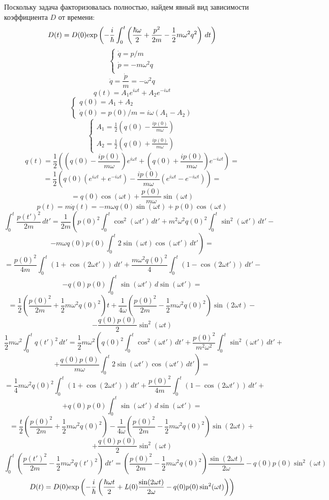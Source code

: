 Поскольку задача факторизовалась полностью, найдем явный вид зависимости коэффициента $D$ от времени:
$$D(t) = D(0)\text{exp}\left( -\frac{i}{\hbar}\int_0^t\left(\frac{\hbar\omega}{2}+\frac{p^2}{2m}-\frac{1}{2}m\omega^2q^2\right)\,dt \right)$$
$$\begin{cases} \dot{q}= p / m \\ \dot{p}=-m\omega^2q \\ \end{cases}$$
$$\ddot{q}=\frac{\dot{p}}{m}=-\omega^2q$$
$$q(t)=A_1 e^{i\omega t} + A_2 e^{-i\omega t} $$
$$\begin{cases} q(0)=A_1 + A_2 \\ \dot{q}(0)=p(0) / m=i\omega(A_1-A_2) \end{cases}$$
$$\begin{cases} A_1 = \frac{1}{2}\left(q(0)-\frac{ip(0)}{m\omega}\right) \\ %
		A_2 = \frac{1}{2}\left(q(0)+\frac{ip(0)}{m\omega}\right) \end{cases} $$
$$q(t) = \frac{1}{2}\left(\left(q(0)-\frac{ip(0)}{m\omega}\right)e^{i\omega t}+%
			  \left(q(0)+\frac{ip(0)}{m\omega}\right)e^{-i\omega t}\right)=$$
$$=\frac{1}{2}\left(q(0)\left(e^{i\omega t}+e^{-i\omega t}\right)-%
		    \frac{ip(0)}{m\omega}\left(e^{i\omega t}-e^{-i\omega t}\right)\right)=$$
$$=q(0)\cos(\omega t)+\frac{p(0)}{m\omega}\sin(\omega t)$$
$$p(t) = m\dot{q}(t) = -m\omega q(0)\sin(\omega t) + p(0) \cos(\omega t)$$
$$\int_0^t\frac{p(t')^2}{2m}\,dt'= \frac{1}{2m}\left(p(0)^2\int_0^t\cos^2(\omega t')\,dt'+%
						     m^2\omega^2q(0)^2\int_0^t\sin^2(\omega t')\,dt'-\right.$$
$$\left.-m\omega q(0)p(0)\int_0^t2\sin(\omega t)\cos(\omega t')\,dt'\right)=$$
$$=\frac{p(0)^2}{4m}\int_0^t(1+\cos(2\omega t'))\,dt'+\frac{m\omega^2q(0)^2}{4}\int_0^t(1-\cos(2\omega t'))\,dt'-$$
$$-q(0)p(0)\int_0^t\sin(\omega t')\,d\sin( \omega t' )=$$
$$=\frac{1}{2}\left(\frac{p(0)^2}{2m}+\frac{1}{2}m\omega^2q(0)^2\right)t+%
   \frac{1}{4\omega}\left(\frac{p(0)^2}{2m}-\frac{1}{2}m\omega^2q(0)^2\right)\sin(2\omega t)-$$
$$-\frac{q(0)p(0)}{2}\sin^2(\omega t)$$
$$\frac{1}{2}m\omega^2\int_0^tq(t')^2\,dt'=\frac{1}{2}m\omega^2\left(q(0)^2\int_0^t\cos^2(\omega t')\,dt'+%
							             \frac{p(0)^2}{m^2\omega^2}\int_0^t\sin^2(\omega t')\,dt'+\right.$$
$$\left.+\frac{q(0)p(0)}{m\omega}\int_0^t2\sin(\omega t')\cos(\omega t')\,dt'\right)=$$
$$=\frac{1}{4}m\omega^2q(0)^2\int_0^t(1+\cos(2\omega t'))\,dt'+\frac{p(0)^2}{4m}\int_0^t(1-\cos(2\omega t'))\,dt'+$$
$$+q(0)p(0)\int_0^t\sin(\omega t')\,d\sin(\omega t')=$$
$$=\frac{t}{2}\left(\frac{p(0)^2}{2m}+\frac{1}{2}m\omega^2q(0)^2\right)-%
   \frac{1}{4\omega}\left(\frac{p(0)^2}{2m}-\frac{1}{2}m\omega^2q(0)^2\right)\sin(2\omega t)+$$
$$+\frac{q(0)p(0)}{2}\sin^2(\omega t)$$
$$\int_0^t\left(\frac{p(t')^2}{2m}-\frac{1}{2}m\omega^2q(t')^2\right)\,dt'=%
  \left(\frac{p(0)^2}{2m}-\frac{1}{2}m\omega^2q(0)^2\right)\frac{\sin(2\omega t)}{2\omega}-q(0)p(0)\sin^2(\omega t)$$
\begin{equation}
D(t)=D(0)\text{exp}\left( -\frac{i}{\hbar}\left(\frac{\hbar\omega t}{2}+\mathit{L}(0)\frac{\sin(2\omega t)}{2\omega}-q(0)p(0)\sin^2(\omega t)\right) \right)
\label{eq:coeff}
\end{equation}

